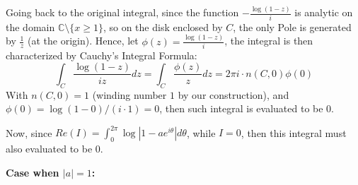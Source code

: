 \documentclass{article}
\begin{document}
Going back to the original integral, since the function $-\frac{\log(1-z)}{i}$ is analytic on the domain $\mathbb{C}\setminus\{x\geq 1\}$, so on the disk enclosed by $C$, the only Pole 
is generated by $\frac{1}{z}$ (at the origin). Hence, let $\phi(z)=\frac{\log(1-z)}{i}$, the integral is then characterized by Cauchy's Integral Formula:
$$\int_{C}\frac{\log(1-z)}{iz}dz = \int_{C}\frac{\phi(z)}{z}dz = 2\pi i\cdot n(C,0)\phi(0)$$
With $n(C,0)=1$ (winding number $1$ by our construction), and $\phi(0)=\log(1-0)/(i\cdot 1)=0$, then such integral is evaluated to be $0$.

Now, since $Re(I) = \int_{0}^{2\pi}\log|1-ae^{i\theta}|d\theta$, while $I=0$, then this integral must also evaluated to be $0$.

\hfil

\textbf{Case when $|a|=1$:}
\end{document}
